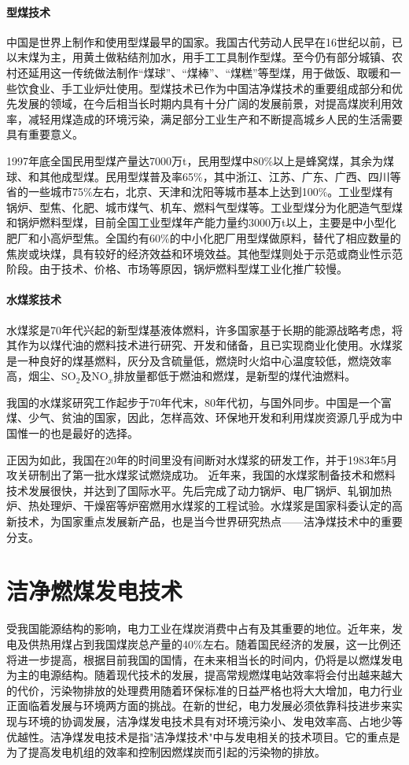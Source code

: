 \documentclass[10pt,openany]{ctexbook}
\begin{document}
\paragraph{型煤技术} 中国是世界上制作和使用型煤最早的国家。我国古代劳动人民早在16世纪以前，已以末煤为主，用黄土做粘结剂加水，用手工工具制作型煤。至今仍有部分城镇、农村还延用这一传统做法制作“煤球”、“煤棒”、“煤糕”等型煤，用于做饭、取暖和一些饮食业、手工业炉灶使用。型煤技术已作为中国洁净煤技术的重要组成部分和优先发展的领域，在今后相当长时期内具有十分广阔的发展前景，对提高煤炭利用效率，减轻用煤造成的环境污染，满足部分工业生产和不断提高城乡人民的生活需要具有重要意义。\par
1997年底全国民用型煤产量达7000万t，民用型煤中80\%以上是蜂窝煤，其余为煤球、和其他成型煤。民用型煤普及率65\%，其中浙江、江苏、广东、广西、四川等省的一些城市75\%左右，北京、天津和沈阳等城市基本上达到100\%。工业型煤有锅炉、型焦、化肥、城市煤气、机车、燃料气型煤等。工业型煤分为化肥造气型煤和锅炉燃料型煤，目前全国工业型煤年产能力量约3000万t以上，主要是中小型化肥厂和小高炉型焦。全国约有60\%的中小化肥厂用型煤做原料，替代了相应数量的焦炭或块煤，具有较好的经济效益和环境效益。其他型煤则处于示范或商业性示范阶段。由于技术、价格、市场等原因，锅炉燃料型煤工业化推广较慢。
\paragraph{水煤浆技术} 水煤浆是70年代兴起的新型煤基液体燃料，许多国家基于长期的能源战略考虑，将其作为以煤代油的燃料技术进行研究、开发和储备，且已实现商业化使用。水煤浆是一种良好的煤基燃料，灰分及含硫量低，燃烧时火焰中心温度较低，燃烧效率高，烟尘、SO$_2$及NO$_x$排放量都低于燃油和燃煤，是新型的煤代油燃料。\par
我国的水煤浆研究工作起步于70年代末，80年代初，与国外同步。中国是一个富煤、少气、贫油的国家，因此，怎样高效、环保地开发和利用煤炭资源几乎成为中国惟一的也是最好的选择。\par
正因为如此，我国在20年的时间里没有间断对水煤浆的研发工作，并于1983年5月攻关研制出了第一批水煤浆试燃烧成功。
 近年来，我国的水煤浆制备技术和燃料技术发展很快，并达到了国际水平。先后完成了动力锅炉、电厂锅炉、轧钢加热炉、热处理炉、干燥窑等炉窑燃用水煤浆的工程试验。水煤浆是国家科委认定的高新技术，为国家重点发展新产品，也是当今世界研究热点——洁净煤技术中的重要分支。
\section{洁净燃煤发电技术}
受我国能源结构的影响，电力工业在煤炭消费中占有及其重要的地位。近年来，发电及供热用煤占到我国煤炭总产量的40\%左右。随着国民经济的发展，这一比例还将进一步提高，根据目前我国的国情，在未来相当长的时间内，仍将是以燃煤发电为主的电源结构。随着现代技术的发展，提高常规燃煤电站效率将会付出越来越大的代价，污染物排放的处理费用随着环保标准的日益严格也将大大增加，电力行业正面临着发展与环境两方面的挑战。在新的世纪，电力发展必须依靠科技进步来实现与环境的协调发展，洁净煤发电技术具有对环境污染小、发电效率高、占地少等优越性。洁净煤发电技术是指"洁净煤技术"中与发电相关的技术项目。它的重点是为了提高发电机组的效率和控制因燃煤炭而引起的污染物的排放。
\end{document}
